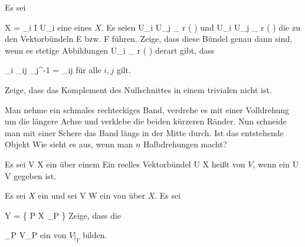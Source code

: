 {}
{

Es sei

\mavergleichskette
{\vergleichskette
{X
}
{ = }{ \bigcup_{i \in I} U_i
}
{  }{
}
{    }{
}
{   }{
}
}
{}{}{}
eine
eines
$X$. Es seien
 {U_i \cap U_j } { _{  r   } \! \left(  \R  \right)
} {}
und
 {U_i \cap U_j } { _{  r   } \! \left(  \R  \right)
} {}
die zu den Vektorbündeln
\mathkor {} {E} {bzw.} {F} {}
führen. Zeige, dass diese Bündel genau dann
sind, wenn es stetige Abbildungen
 { U_i } { _{  r   } \! \left(  \R  \right)
} {}
derart gibt, dass
 {} {}

\mavergleichskettedisp
{\vergleichskette
{ \alpha_i \circ  \varphi_{ij}  \circ \alpha_j^{-1}
}
{ =} { \psi_{ij}
}
{ } {
}
{ } {
}
{ } {
}
}
{}{}{}
für alle $i,j$ gilt.

}
{} {}

{}
{

Zeige, dass das Komplement des Nullschnittes in einem trivialen
nicht
ist.

}
{} {}

{}
{

Man nehme ein schmales rechteckiges Band, verdrehe es mit einer Volldrehung um die längere Achse und verklebe die beiden kürzeren Ränder. Nun schneide man mit einer Schere das Band längs in  der Mitte durch. Ist das entstehende Objekt
Wie sieht es aus, wenn man $n$ Halbdrehungen macht?

}
{} {}

Es sei
\maabb {} { V } { X
} {}
ein
über einem
Ein reelles Vektorbündel
\maabb {} { U } { X
} {}
heißt
von $V$, wenn ein
\maabb {} { U } { V
} {}
gegeben ist.

{}
{

Es sei $X$ ein
und sei
\maabb {\varphi} { V } { W
} {}
ein
von
über $X$. Es sei

\mavergleichskettedisp
{\vergleichskette
{ Y
}
{ =} { \left\{ P \in X  \mid  \varphi_P          \right\}
}
{ } {
}
{ } {
}
{ } {
}
}
{}{}{}
Zeige, dass die
 {} {}

\mavergleichskette
{\vergleichskette
{  \varphi_P
}
{ \subseteq }{ V_P
}
{  }{
}
{    }{
}
{   }{
}
}
{}{}{}
ein
von $V\vert_Y$ bilden.

}
{} {}

